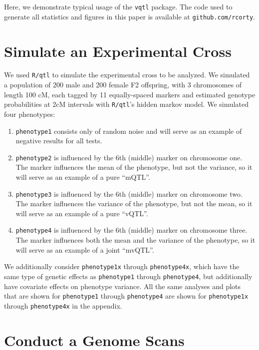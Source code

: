 \documentclass[9pt,twocolumn,twoside]{gsag3jnl}
\begin{document}
Here, we demonstrate typical usage of the \texttt{vqtl} package.
The code used to generate all statistics and figures in this paper is available at \texttt{github.com/rcorty}.




\section*{Simulate an Experimental Cross}

We used \texttt{R/qtl} to simulate the experimental cross to be analyzed.
We simulated a population of 200 male and 200 female F2 offspring, with 3 chromosomes of length 100 cM, each tagged by 11 equally-spaced markers and estimated genotype probabilities at 2cM intervals with \texttt{R/qtl}'s hidden markov model.
We simulated four phenotypes:

\begin{enumerate}
	\item \texttt{phenotype1} consists only of random noise and will serve as an example of negative results for all tests.
	\item \texttt{phenotype2} is influenced by the 6th (middle) marker on chromosome one.  The marker influences the mean of the phenotype, but not the variance, so it will serve as an example of a pure ``mQTL''.
	\item \texttt{phenotype3} is influenced by the 6th (middle) marker on chromosome two.  The marker influences the variance of the phenotype, but not the mean, so it will serve as an example of a pure ``vQTL''.
	\item \texttt{phenotype4} is influenced by the 6th (middle) marker on chromosome three.  The marker influences both the mean and the variance of the phenotype, so it will serve as an example of a joint ``mvQTL''.
\end{enumerate}

We additionally consider \texttt{phenotype1x} through \texttt{phenotype4x}, which have the same type of genetic effects as \texttt{phenotype1} through \texttt{phenotype4}, but additionally have covariate effects on phenotype variance.
All the same analyses and plots that are shown for \texttt{phenotype1} through \texttt{phenotype4} are shown for \texttt{phenotype1x} through \texttt{phenotype4x} in the appendix.




\section*{Conduct a Genome Scans}
\end{document}
